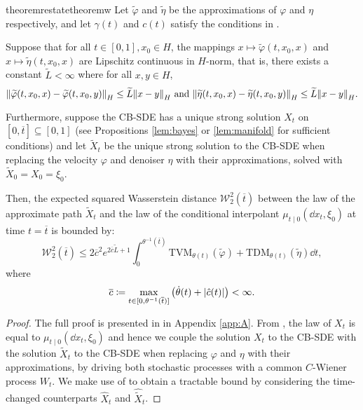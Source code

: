 \begin{theorembox}
  \begin{restatable}{theorem}{restatetheoremw}\label{thm:w2}
    Let \(\widetilde{\varphi}\) and \(\widetilde{\eta}\) be the approximations of \(\varphi\) and \(\eta\) respectively, and let \(\gamma(t)\) and \(c(t)\) satisfy the conditions in .

    Suppose that for all \(t \in [0, 1], x_{0} \in H\), the mappings \(x \mapsto \widetilde{\varphi}(t, x_{0}, x)\) and \(x \mapsto \widetilde{\eta}(t, x_{0}, x)\) are Lipschitz continuous in \(H\)-norm, that is, there exists a constant \(\widetilde{L} < \infty\) where for all \(x, y \in H\),
    \[
      \norm{\widetilde{\varphi}(t, x_{0}, x) - \widetilde{\varphi}(t, x_{0}, y)}_{H} \leq \widetilde{L} \norm{x - y}_{H} \text{ and } \norm{\widetilde{\eta}(t, x_{0}, x) - \widetilde{\eta}(t, x_{0}, y)}_{H} \leq \widetilde{L} \norm{x - y}_{H}.
    \]

    Furthermore, suppose the CB-SDE has a unique strong solution \(X_{t}\) on \([0, \overline{t}] \subseteq [0, 1]\) (see Propositions \ref{lem:bayes} or \ref{lem:manifold} for sufficient conditions) and let \(\widetilde{X}_{t}\) be the unique strong solution to the CB-SDE when replacing the velocity \(\varphi\) and denoiser \(\eta\) with their approximations, solved with \(\widetilde{X}_{0} = X_{0} = \xi_{0}\).

    Then, the expected squared Wasserstein distance \(\mathcal{W}_{2}^{2}(\overline{t})\) between the law of the approximate path \(\widetilde{X}_{t}\) and the law of the conditional interpolant \(\mu_{t \mid 0}(\dd{x_{t}}, \xi_{0})\) at time \(t = \overline{t}\) is bounded by:
    \begin{equation}
      \mathcal{W}_{2}^{2}(\overline{t}) \leq 2\overline{c}^{2} e^{2 \overline{c} \widetilde{L} + 1} \int_{0}^{\theta^{-1}(\overline{t})} \mathrm{TVM}_{\theta(t)}(\widetilde{\varphi}) + \mathrm{TDM}_{\theta(t)}(\widetilde{\eta})\dd{t}, \label{eqn:w2}
    \end{equation}
    where
    \[
      \overline{c} \coloneqq \mathop{\underset{t \in [0, \theta^{-1}(\overline{t})]}{\max}} \qty(\dot{\theta}(t) + \abs{\hat{c}(t)}) < \infty.
    \]
  \end{restatable}
\end{theorembox}
\begin{proof} The full proof is presented in  in Appendix \ref{app:A}. From , the law of \(X_{t}\) is equal to \(\mu_{t \mid 0}(\dd{x_{t}}, \xi_{0})\) and hence we couple the solution \(X_{t}\) to the CB-SDE with the solution \(\widetilde{X}_{t}\) to the CB-SDE when replacing \(\varphi\) and \(\eta\) with their approximations, by driving both stochastic processes with a common \(C\)-Wiener process \(W_{t}\). We make use of  to obtain a tractable bound by considering the time-changed counterparts \(\hat{X}_{t}\) and \(\hat{\widetilde{X}}_{t}\).
\end{proof}

